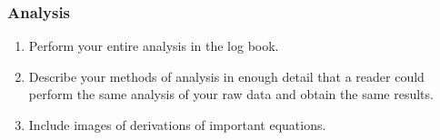 \documentclass[11 pt]{article}
\begin{document}
\subsubsection*{Analysis}
\begin{enumerate}
\item Perform your entire analysis in the log book.
  
\item Describe your methods of analysis in enough detail that a reader
  could perform the same analysis of your raw data and obtain the same
  results.

\item Include images of derivations of important equations.
\end{enumerate}
\end{document}
